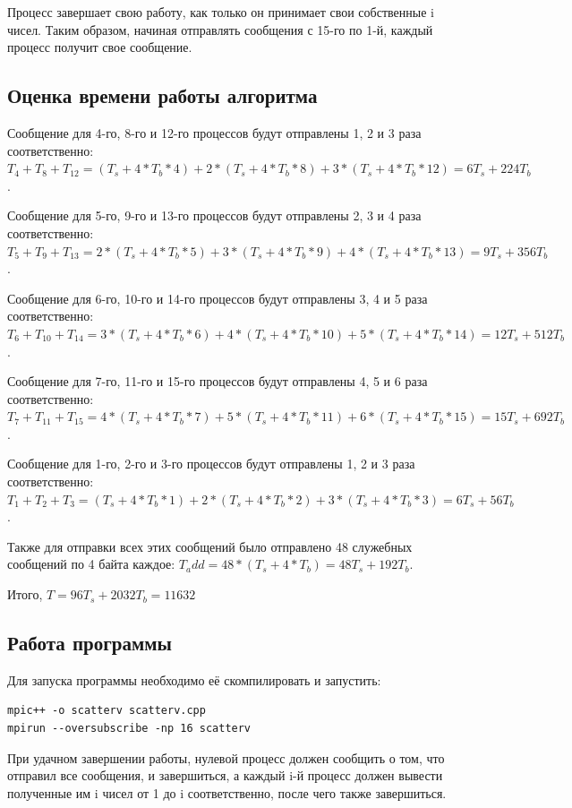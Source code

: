 \documentclass[a4paper,12pt,titlepage,finall]{article}
\begin{document}
Процесс завершает свою работу, как только он принимает свои собственные i чисел.
Таким образом, начиная отправлять сообщения с 15-го по 1-й, каждый процесс
получит свое сообщение.

\subsection{Оценка времени работы алгоритма}

Сообщение для 4-го, 8-го и 12-го процессов будут отправлены 1, 2 и 3 раза
соответственно: $T_4 + T_8 + T_{12} = (T_s + 4 * T_b * 4) + 2 * (T_s + 4 * T_b * 8) +
3 * (T_s + 4 * T_b * 12) = 6T_s + 224T_b$.

Сообщение для 5-го, 9-го и 13-го процессов будут отправлены 2, 3 и 4 раза
соответственно: $T_5 + T_9 + T_{13} = 2 * (T_s + 4 * T_b * 5) + 3 * (T_s + 4 * T_b
* 9) + 4 * (T_s + 4 * T_b * 13) = 9T_s + 356T_b$.

Сообщение для 6-го, 10-го и 14-го процессов будут отправлены 3, 4 и 5 раза
соответственно: $T_6 + T_{10} + T_{14} = 3 * (T_s + 4 * T_b * 6) + 4 * (T_s + 4 * T_b
* 10) + 5 * (T_s + 4 * T_b * 14) = 12T_s + 512T_b$.

Сообщение для 7-го, 11-го и 15-го процессов будут отправлены 4, 5 и 6 раза
соответственно: $T_7 + T_{11} + T_{15} = 4 * (T_s + 4 * T_b * 7) + 5 * (T_s + 4 * T_b
* 11) + 6 * (T_s + 4 * T_b * 15) = 15T_s + 692T_b$.

Сообщение для 1-го, 2-го и 3-го процессов будут отправлены 1, 2 и 3 раза
соответственно: $T_1 + T_2 + T_3 = (T_s + 4 * T_b * 1) + 2 * (T_s + 4 * T_b * 2)
+ 3 * (T_s + 4 * T_b * 3) = 6T_s + 56T_b$.

Также для отправки всех этих сообщений было отправлено 48 служебных сообщений по
4 байта каждое:
$T_add = 48 * (T_s + 4 * T_b) = 48T_s + 192T_b$.

Итого, $T = 96T_s + 2032T_b = 11632$

\subsection{Работа программы}

Для запуска программы необходимо её скомпилировать и запустить:

\begin{lstlisting}
mpic++ -o scatterv scatterv.cpp
mpirun --oversubscribe -np 16 scatterv
\end{lstlisting}

При удачном завершении работы, нулевой процесс должен сообщить о том, что
отправил все сообщения, и завершиться, а каждый i-й процесс должен вывести
полученные им i чисел от 1 до i соответственно, после чего также завершиться.
\end{document}
